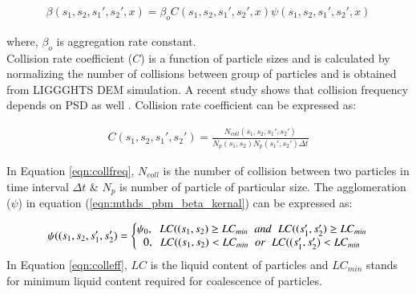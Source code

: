\documentclass[preprint,10pt,authoryear]{elsarticle}
\begin{document}
\begin{linenumbers}
\begin{align}
\beta(s_1,s_2,s_1',s_2',x) = \beta_oC(s_1,s_2,s_1',s_2',x)\psi(s_1,s_2,s_1',s_2',x)
\label{eqn:mthds_pbm_beta_kernal}
\end{align}

where, $\beta_o$ is aggregation rate constant.\\
Collision rate coefficient ($C$) is a function of particle sizes and is calculated by normalizing the 
number of collisions between group of particles \citep{gantt2006} and is obtained from LIGGGHTS 
DEM simulation. A recent study shows that collision frequency depends on PSD as well 
\citep{sen2014}. Collision rate coefficient can be expressed as:

\begin{align}
C(s_1,s_2,s_1',s_2')=\frac{N_{coll}(s_1,s_2,s_1',s_2')}{N_p(s_1,s_2)N_p(s_1',s_2')\Delta t}
\label{eqn:collfreq}
\end{align}

In Equation \ref{eqn:collfreq}, $N_{coll}$ is the number of collision between two particles in 
time interval $\Delta t$ \& $N_p$ is number of particle of particular size. The agglomeration 
($\psi$) in equation (\ref{eqn:mthds_pbm_beta_kernal}) can be expressed as:

\begin{align}
\psi((s_1,s_2,s_1',s_2') = 
\left\{\begin{matrix}
\psi_0,\hspace{0.2cm} LC((s_1,s_2) \geq LC_{min}\hspace{0.2cm} and\hspace{0.2cm} LC((s_1',s_2') \geq LC_{min}	\\ 
0,\hspace{0.2cm} LC((s_1,s_2) < LC_{min}\hspace{0.2cm} or\hspace{0.2cm} LC((s_1',s_2') < LC_{min}
\end{matrix}\right.
\label{eqn:colleff}
\end{align}
 In Equation \ref{eqn:colleff}, $LC$ is the liquid content of particles and $LC_{min}$ stands for minimum 
 liquid content required for coalescence of particles. 




\end{linenumbers}
\end{document}
